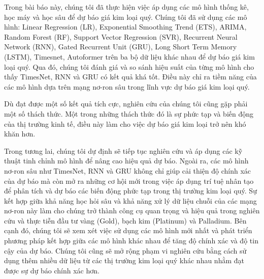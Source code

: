 Trong bài báo này, chúng tôi đã thực hiện việc áp dụng các mô hình thống kê, học máy và học sâu để dự báo giá kim loại quý. Chúng tôi đã sử dụng các mô hình: Linear Regression (LR), Exponential Smoothing Trend (ETS), ARIMA, Random Forest (RF), Support Vector Regression (SVR), Recurrent Neural Network (RNN), Gated Recurrent Unit  (GRU), Long Short Term Memory (LSTM), Timesnet, Autoformer trên ba bộ dữ liệu khác nhau để dự báo giá kim loại quý. Qua đó, chúng tôi đánh giá và so sánh hiệu suất của từng mô hình cho thấy TimesNet, RNN và GRU có kết quả khá tốt. Điều này chỉ ra tiềm năng của các mô hình dựa trên mạng nơ-ron sâu trong lĩnh vực dự báo giá kim loại quý. 

Dù đạt được một số kết quả tích cực, nghiên cứu của chúng tôi cũng gặp phải một số thách thức. Một trong những thách thức đó là sự phức tạp và biến động của thị trường kinh tế, điều này làm cho việc dự báo giá kim loại trở nên khó khăn hơn.

Trong tương lai, chúng tôi dự định sẽ tiếp tục nghiên cứu và áp dụng các kỹ thuật tinh chỉnh mô hình để nâng cao hiệu quả dự báo. Ngoài ra, các mô hình nơ-ron sâu như TimesNet, RNN và GRU không chỉ giúp cải thiện độ chính xác của dự báo mà còn mở ra những cơ hội mới trong việc áp dụng trí tuệ nhân tạo để phân tích và dự báo các biến động phức tạp trong thị trường kim loại quý. Sự kết hợp giữa khả năng học hỏi sâu và khả năng xử lý dữ liệu chuỗi của các mạng nơ-ron này làm cho chúng trở thành công cụ quan trọng và hiệu quả trong nghiên cứu và thực tiễn đầu tư vàng (Gold), bạch kim (Platinum) và Palladium. Bên cạnh đó, chúng tôi sẽ xem xét việc sử dụng các mô hình mới nhất và phát triển phương pháp kết hợp giữa các mô hình khác nhau để tăng độ chính xác và độ tin cậy của dự báo. Chúng tôi cũng sẽ mở rộng phạm vi nghiên cứu bằng cách sử dụng thêm nhiều dữ liệu từ các thị trường kim loại quý khác nhau nhằm đạt được sự dự báo chính xác hơn.